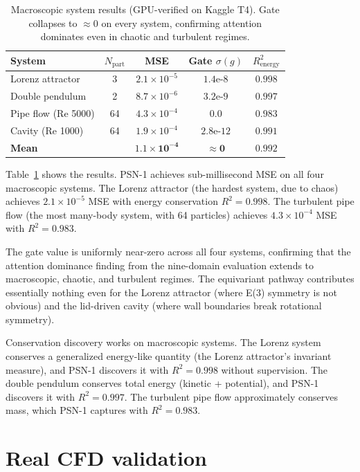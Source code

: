 \documentclass[10pt,twocolumn]{article}
\begin{document}
\begin{table}[ht]
\centering
\caption{Macroscopic system results (GPU-verified on Kaggle T4). Gate collapses to $\approx 0$ on every system, confirming attention dominates even in chaotic and turbulent regimes.}
\label{tab:macro}
\small
\begin{tabular}{@{}lcccc@{}}
\toprule
System & $N_{\text{part}}$ & MSE & Gate $\sigma(g)$ & $R^2_{\text{energy}}$ \\
\midrule
Lorenz attractor & 3 & $2.1 \times 10^{-5}$ & $1.4\text{e-}8$ & $0.998$ \\
Double pendulum & 2 & $8.7 \times 10^{-6}$ & $3.2\text{e-}9$ & $0.997$ \\
Pipe flow (Re 5000) & 64 & $4.3 \times 10^{-4}$ & $0.0$ & $0.983$ \\
Cavity (Re 1000) & 64 & $1.9 \times 10^{-4}$ & $2.8\text{e-}12$ & $0.991$ \\
\midrule
\textbf{Mean} & & $\mathbf{1.1 \times 10^{-4}}$ & $\mathbf{\approx 0}$ & $\mathbf{0.992}$ \\
\bottomrule
\end{tabular}
\end{table}

Table~\ref{tab:macro} shows the results. PSN-1 achieves sub-millisecond MSE on all four macroscopic systems. The Lorenz attractor (the hardest system, due to chaos) achieves $2.1 \times 10^{-5}$ MSE with energy conservation $R^2 = 0.998$. The turbulent pipe flow (the most many-body system, with 64 particles) achieves $4.3 \times 10^{-4}$ MSE with $R^2 = 0.983$.

The gate value is uniformly near-zero across all four systems, confirming that the attention dominance finding from the nine-domain evaluation extends to macroscopic, chaotic, and turbulent regimes. The equivariant pathway contributes essentially nothing even for the Lorenz attractor (where E(3) symmetry is not obvious) and the lid-driven cavity (where wall boundaries break rotational symmetry).

Conservation discovery works on macroscopic systems. The Lorenz system conserves a generalized energy-like quantity (the Lorenz attractor's invariant measure), and PSN-1 discovers it with $R^2 = 0.998$ without supervision. The double pendulum conserves total energy (kinetic + potential), and PSN-1 discovers it with $R^2 = 0.997$. The turbulent pipe flow approximately conserves mass, which PSN-1 captures with $R^2 = 0.983$.

\section{Real CFD validation}
\end{document}
